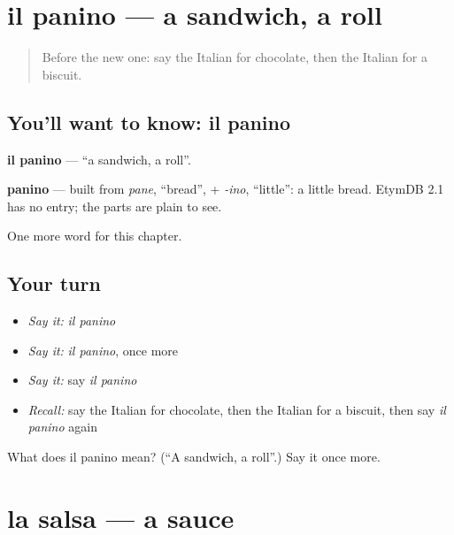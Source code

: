 \section[il panino]{il panino — a sandwich, a roll}

\label{lesson:IT-C108-panino}



\begin{quote}
Before the new one: say the Italian for chocolate, then the Italian for a biscuit.
\end{quote}

\subsection*{You'll want to know: il panino}
\textbf{il panino} — \textquotedblleft{}a sandwich, a roll\textquotedblright{}.

\begin{cousinweb}
\textbf{panino} — built from \emph{pane}, \textquotedblleft{}bread\textquotedblright{}, + \emph{-ino}, \textquotedblleft{}little\textquotedblright{}: a little bread. EtymDB 2.1 has no entry; the parts are plain to see.
\end{cousinweb}

\begin{grammarlens}[title={What you've built}]
One more word for this chapter.
\end{grammarlens}

\subsection*{Your turn}
\begin{itemize}
\raggedright
  \item \emph{Say it:} \emph{il panino}
  \item \emph{Say it:} \emph{il panino}, once more
  \item \emph{Say it:} say \emph{il panino}
  \item \emph{Recall:} say the Italian for chocolate, then the Italian for a biscuit, then say \emph{il panino} again
\end{itemize}

\begin{tcolorbox}[breakable,colback=teal!4,colframe=teal!35!black,title={Before you move on}]
What does il panino mean? (\textquotedblleft{}A sandwich, a roll\textquotedblright{}.) Say it once more.
\end{tcolorbox}
\section[la salsa]{la salsa — a sauce}

